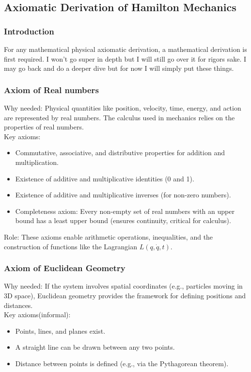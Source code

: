 \subsection{Axiomatic Derivation of Hamilton Mechanics }
\subsubsection{Introduction}
\par For any mathematical physical axiomatic derivation, a mathematical derivation is first required. I won't go super in depth but I will still go over it for rigors sake. I may go back and do a deeper dive but for now I will simply put these things.
\subsubsection{Axiom of Real numbers}
Why needed: Physical quantities like position, velocity, time, energy, and action are represented by real numbers. The calculus used in mechanics relies on the properties of real numbers.
\\
Key axioms:
\begin{itemize}
    \item Commutative, associative, and distributive properties for addition and multiplication.\
    \item Existence of additive and multiplicative identities (0 and 1).
    \item Existence of additive and multiplicative inverses (for non-zero numbers).
    \item Completeness axiom: Every non-empty set of real numbers with an upper bound has a least upper bound (ensures continuity, critical for calculus).
\end{itemize}



Role: These axioms enable arithmetic operations, inequalities, and the construction of functions like the Lagrangian $ L(q, \dot{q}, t) $.

\subsubsection{Axiom of Euclidean Geometry}
Why needed: If the system involves spatial coordinates (e.g., particles moving in 3D space), Euclidean geometry provides the framework for defining positions and distances.
\\
Key axioms(informal):
\begin{itemize}
    \item Points, lines, and planes exist.
    \item A straight line can be drawn between any two points.
    \item Distance between points is defined (e.g., via the Pythagorean theorem).

\end{itemize}

